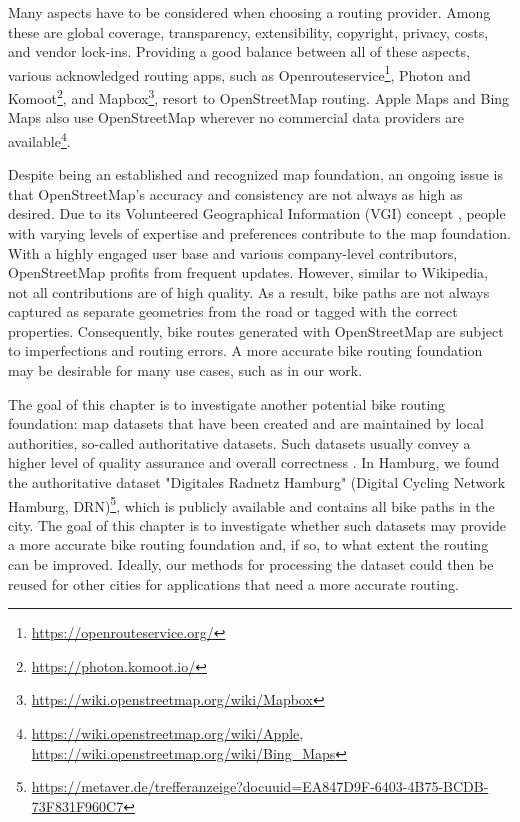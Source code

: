 Many aspects have to be considered when choosing a routing provider. Among these are global coverage, transparency, extensibility, copyright, privacy, costs, and vendor lock-ins. Providing a good balance between all of these aspects, various acknowledged routing apps, such as Openrouteservice\footnote{\url{https://openrouteservice.org/}}, Photon and Komoot\footnote{\url{https://photon.komoot.io/}}, and Mapbox\footnote{\url{https://wiki.openstreetmap.org/wiki/Mapbox}}, resort to OpenStreetMap routing. Apple Maps and Bing Maps also use OpenStreetMap wherever no commercial data providers are available\footnote{\url{https://wiki.openstreetmap.org/wiki/Apple}, \url{https://wiki.openstreetmap.org/wiki/Bing_Maps}}. 

Despite being an established and recognized map foundation, an ongoing issue is that Open\allowbreak Street\allowbreak Map's accuracy and consistency are not always as high as desired. Due to its Volunteered Geographical Information (VGI) concept \cite{wasserman_evaluating_2019, jacobs_openstreetmap_2020, vybornova_automated_2023}, people with varying levels of expertise and preferences contribute to the map foundation. With a highly engaged user base and various company-level contributors, OpenStreetMap profits from frequent updates. However, similar to Wikipedia, not all contributions are of high quality. As a result, bike paths are not always captured as separate geometries from the road or tagged with the correct properties. Consequently, bike routes generated with OpenStreetMap are subject to imperfections and routing errors. A more accurate bike routing foundation may be desirable for many use cases, such as in our work.

The goal of this chapter is to investigate another potential bike routing foundation: map datasets that have been created and are maintained by local authorities, so-called authoritative datasets. Such datasets usually convey a higher level of quality assurance and overall correctness \cite{brovelli_towards_2017}. In Hamburg, we found the authoritative dataset "Digitales Radnetz Hamburg" (Digital Cycling Network Hamburg, DRN)\footnote{\url{https://metaver.de/trefferanzeige?docuuid=EA847D9F-6403-4B75-BCDB-73F831F960C7}}, which is publicly available and contains all bike paths in the city. The goal of this chapter is to investigate whether such datasets may provide a more accurate bike routing foundation and, if so, to what extent the routing can be improved. Ideally, our methods for processing the dataset could then be reused for other cities for applications that need a more accurate routing.

